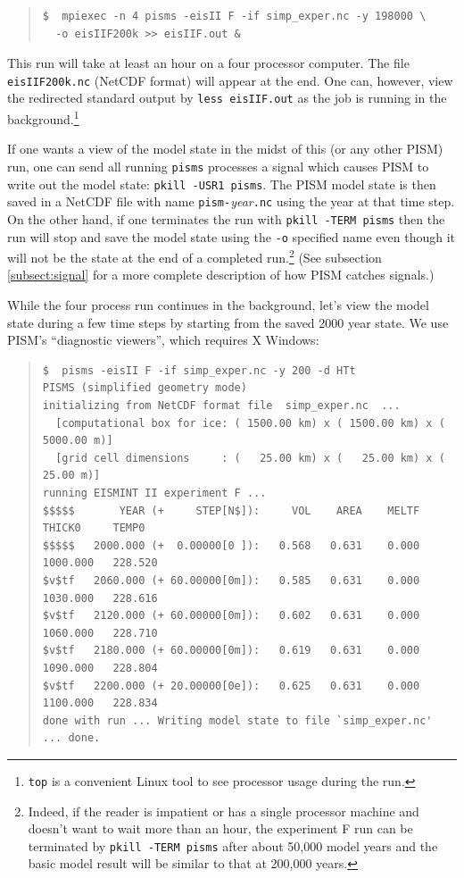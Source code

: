 \documentclass[11pt,final]{amsart}
\renewcommand{\t}[1]{\texttt{#1}}
\begin{document}
\small\begin{quote}\begin{verbatim}
$  mpiexec -n 4 pisms -eisII F -if simp_exper.nc -y 198000 \
  -o eisIIF200k >> eisIIF.out &
\end{verbatim}
\end{quote}\normalsize

This run will take at least an hour on a four processor computer.  The file \verb|eisIIF200k.nc| (NetCDF format) will appear at the end.  One can, however, view the redirected standard output by \verb|less eisIIF.out| as the job is running in the background.\footnote{\t{top} is a convenient Linux tool to see processor usage during the run.}

If one wants a view of the model state in the midst of this (or any other PISM) run, one can send all running \verb|pisms| processes a signal which causes PISM to write out the model state: \verb|pkill -USR1 pisms|.  The PISM model state is then saved in a NetCDF file with name \verb|pism-|\emph{year}\verb|.nc| using the year at that time step.  On the other hand, if one terminates the run with \verb|pkill -TERM pisms| then the run will stop and save the model state using the \verb|-o| specified name even though it will not be the state at the end of a completed run.\footnote{Indeed, if the reader is impatient or has a single processor machine and doesn't want to wait more than an hour, the experiment F run can be terminated by \t{pkill -TERM pisms} after about 50,000 model years and the basic model result will be similar to that at 200,000 years.}  (See subsection \ref{subsect:signal} for a more complete description of how PISM catches signals.)

While the four process run continues in the background, let's view the model state during a few time steps by starting from the saved 2000 year state.  We use PISM's ``diagnostic viewers'', which requires X Windows:

\small\begin{quote}\begin{verbatim}
$  pisms -eisII F -if simp_exper.nc -y 200 -d HTt
PISMS (simplified geometry mode)
initializing from NetCDF format file  simp_exper.nc  ...
  [computational box for ice: ( 1500.00 km) x ( 1500.00 km) x ( 5000.00 m)]
  [grid cell dimensions     : (   25.00 km) x (   25.00 km) x (   25.00 m)]
running EISMINT II experiment F ...
$$$$$       YEAR (+     STEP[N$]):     VOL    AREA    MELTF     THICK0     TEMP0
$$$$$   2000.000 (+  0.00000[0 ]):   0.568   0.631    0.000   1000.000   228.520
$v$tf   2060.000 (+ 60.00000[0m]):   0.585   0.631    0.000   1030.000   228.616
$v$tf   2120.000 (+ 60.00000[0m]):   0.602   0.631    0.000   1060.000   228.710
$v$tf   2180.000 (+ 60.00000[0m]):   0.619   0.631    0.000   1090.000   228.804
$v$tf   2200.000 (+ 20.00000[0e]):   0.625   0.631    0.000   1100.000   228.834
done with run ... Writing model state to file `simp_exper.nc' ... done.
\end{verbatim}
\end{quote}\normalsize
\end{document}

